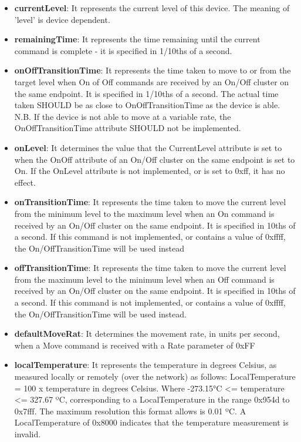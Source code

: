\begin{itemize}
\item \textbf{currentLevel}: It represents the current level of this device. The meaning of 'level' is device dependent.
\item \textbf{remainingTime}: It represents the time remaining until the current command is complete - it is specified in 1/10ths of a second.
\item \textbf{onOffTransitionTime}: It represents the time taken to move to or from the target level when On of Off commands are received by an On/Off cluster on the same endpoint. It is specified in 1/10ths of a second. The actual time taken SHOULD be as close to OnOffTransitionTime as the device is able. N.B. If the device is not able to move at a variable rate, the OnOffTransitionTime attribute SHOULD not be implemented.
\item \textbf{onLevel}: It determines the value that the CurrentLevel attribute is set to when the OnOff attribute of an On/Off cluster on the same endpoint is set to On. If the OnLevel attribute is not implemented, or is set to 0xff, it has no effect.
\item \textbf{onTransitionTime}: It represents the time taken to move the current level from the minimum level to the maximum level when an On command is received by an On/Off cluster on the same endpoint. It is specified in 10ths of a second. If this command is not implemented, or contains a value of 0xffff, the On/OffTransitionTime will be used instead
\item \textbf{offTransitionTime}: It represents the time taken to move the current level from the maximum level to the minimum level when an Off command is received by an On/Off cluster on the same endpoint. It is specified in 10ths of a second. If this command is not implemented, or contains a value of 0xffff, the On/OffTransitionTime will be used instead.
\item \textbf{defaultMoveRat}: It determines the movement rate, in units per second, when a Move command is received with a Rate parameter of 0xFF
\item \textbf{localTemperature}: It represents the temperature in degrees Celsius, as measured locally or remotely (over the network) as follows: LocalTemperature = 100 x temperature in degrees Celsius. Where -273.15°C <= temperature <= 327.67 ºC, corresponding to a LocalTemperature in the range 0x954d to 0x7fff. The maximum resolution this format allows is 0.01 ºC. A LocalTemperature of 0x8000 indicates that the temperature measurement is invalid.

\end{itemize}
